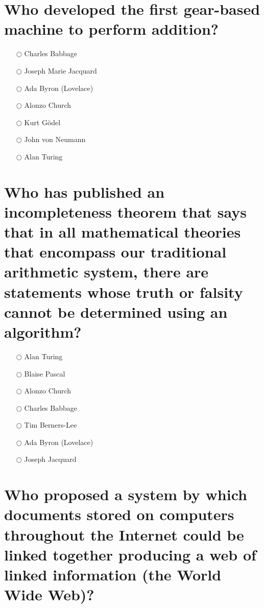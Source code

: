 \documentclass[a4paper,11pt,oneside]{book}
\begin{document}
\begin{sloppypar}
\section{Who developed the first gear-based machine to perform addition?}

\label{q:437:mc:en:True}

\begin{itemize}
  \item[$\bigcirc$] Charles Babbage
  \item[$\bigcirc$] Joseph Marie Jacquard
  \item[$\bigcirc$] Ada Byron (Lovelace)
  \item[$\bigcirc$] Alonzo Church
  \item[$\bigcirc$] Kurt G\"odel
  \item[$\bigcirc$] John von Neumann
  \item[$\bigcirc$] Alan Turing
\end{itemize}



\section{Who has published an incompleteness theorem that says that in all mathematical theories that encompass our traditional arithmetic system, there are statements whose truth or falsity cannot be determined using an algorithm?}

\label{q:438:mc:en:True}

\begin{itemize}
  \item[$\bigcirc$] Alan Turing
  \item[$\bigcirc$] Blaise Pascal
  \item[$\bigcirc$] Alonzo Church
  \item[$\bigcirc$] Charles Babbage
  \item[$\bigcirc$] Tim Berners-Lee
  \item[$\bigcirc$] Ada Byron (Lovelace)
  \item[$\bigcirc$] Joseph Jacquard
\end{itemize}



\section{Who proposed a system by which documents stored on computers throughout the Internet could be linked together producing a web of linked information (the World Wide Web)?}


\end{sloppypar}
\end{document}

